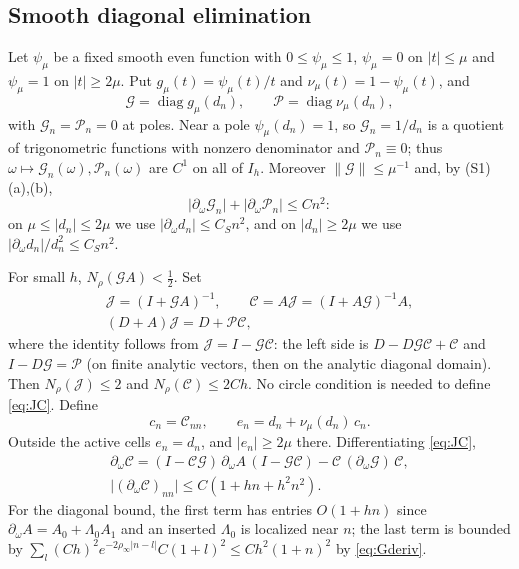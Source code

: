 \documentclass[11pt]{amsart}
\numberwithin{equation}{section}
\theoremstyle{definition}
\theoremstyle{remark}
\newcommand{\abs}[1]{\lvert #1\rvert}
\newcommand{\norm}[1]{\lVert #1\rVert}
\newcommand{\cG}{\mathcal G}
\newcommand{\cP}{\mathcal P}
\newcommand{\cJ}{\mathcal J}
\newcommand{\cC}{\mathcal C}
\begin{document}
\subsection{Smooth diagonal elimination}
Let $\psi_\mu$ be a fixed smooth even function with $0\le\psi_\mu\le1$, $\psi_\mu=0$ on $\abs t\le\mu$ and $\psi_\mu=1$ on $\abs t\ge2\mu$. Put $g_\mu(t)=\psi_\mu(t)/t$ and $\nu_\mu(t)=1-\psi_\mu(t)$, and
\[
\cG=\operatorname{diag}g_\mu(d_n),\qquad\cP=\operatorname{diag}\nu_\mu(d_n),
\]
with $\cG_n=\cP_n=0$ at poles. Near a pole $\psi_\mu(d_n)=1$, so $\cG_n=1/d_n$ is a quotient of trigonometric functions with nonzero denominator and $\cP_n\equiv0$; thus $\omega\mapsto\cG_n(\omega),\cP_n(\omega)$ are $C^1$ on all of $I_h$. Moreover $\norm{\cG}\le\mu^{-1}$ and, by (S1)(a),(b),
\begin{equation}\label{eq:Gderiv}
\abs{\partial_\omega\cG_n}+\abs{\partial_\omega\cP_n}\le Cn^2 :
\end{equation}
on $\mu\le\abs{d_n}\le2\mu$ we use $\abs{\partial_\omega d_n}\le C_Sn^2$, and on $\abs{d_n}\ge2\mu$ we use $\abs{\partial_\omega d_n}/d_n^2\le C_Sn^2$.

For small $h$, $N_\rho(\cG A)<\frac12$. Set
\begin{equation}\label{eq:JC}
\begin{gathered}
\cJ=(I+\cG A)^{-1},\qquad\cC=A\cJ=(I+A\cG)^{-1}A,\\
(D+A)\cJ=D+\cP\cC,
\end{gathered}
\end{equation}
where the identity follows from $\cJ=I-\cG\cC$: the left side is $D-D\cG\cC+\cC$ and $I-D\cG=\cP$ (on finite analytic vectors, then on the analytic diagonal domain). Then $N_\rho(\cJ)\le2$ and $N_\rho(\cC)\le2Ch$. No circle condition is needed to define \eqref{eq:JC}. Define
\begin{equation}\label{eq:eff}
c_n=\cC_{nn},\qquad e_n=d_n+\nu_\mu(d_n)\,c_n .
\end{equation}
Outside the active cells $e_n=d_n$, and $\abs{e_n}\ge2\mu$ there. Differentiating \eqref{eq:JC},
\begin{equation}\label{eq:Comega}
\begin{gathered}
\partial_\omega\cC=(I-\cC\cG)\,\partial_\omega A\,(I-\cG\cC)-\cC\,(\partial_\omega\cG)\,\cC,\\
\abs{(\partial_\omega\cC)_{nn}}\le C(1+hn+h^2n^2).
\end{gathered}
\end{equation}
For the diagonal bound, the first term has entries $O(1+hn)$ since $\partial_\omega A=A_0+\Lambda_0A_1$ and an inserted $\Lambda_0$ is localized near $n$; the last term is bounded by $\sum_l(Ch)^2e^{-2\rho_\infty\abs{n-l}}C(1+l)^2\le Ch^2(1+n)^2$ by \eqref{eq:Gderiv}.
\end{document}
